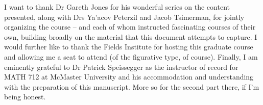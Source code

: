 %
%


I want to thank Dr Gareth Jones for his wonderful series on the content presented, along with Drs Ya'acov Peterzil and Jacob Tsimerman, for jointly organizing the course -- and each of whom instructed fascinating courses of their own, building broadly on the material that this document attempts to capture. I would further like to thank the Fields Institute for hosting this graduate course and allowing me a seat to attend (of the figurative type, of course). Finally, I am eminently grateful to Dr Patrick Speissegger as the instructor of record for MATH 712 at McMaster University and his accommodation and understanding with the preparation of this manuscript. More so for the second part there, if I'm being honest.

